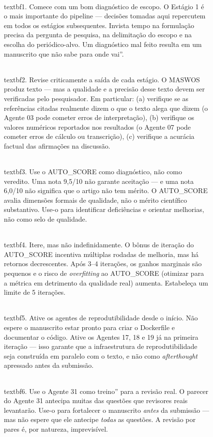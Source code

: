 \begin{figure}
\\textbf{1. Comece com um bom diagnóstico de escopo.} O
Estágio 1 é o mais importante do pipeline — decisões tomadas
aqui repercutem em todos os estágios subsequentes. Invista
tempo na formulação precisa da pergunta de pesquisa, na
delimitação do escopo e na escolha do periódico-alvo. Um
diagnóstico mal feito resulta em um manuscrito que não sabe
para onde vai''.

\\textbf{2. Revise criticamente a saída de cada estágio.}
O MASWOS produz texto — mas a qualidade e a precisão desse
texto devem ser verificadas pelo pesquisador. Em particular:
(a) verifique se as referências citadas realmente dizem o
que o texto alega que dizem (o Agente 03 pode cometer erros
de interpretação), (b) verifique os valores numéricos
reportados nos resultados (o Agente 07 pode cometer erros de
cálculo ou transcrição), (c) verifique a acurácia factual
das afirmações na discussão.

\\textbf{3. Use o AUTO\_SCORE como diagnóstico, não como
veredito.} Uma nota 9,5/10 não garante aceitação — e uma nota
6,0/10 não significa que o artigo não tem mérito. O
AUTO\_SCORE avalia dimensões formais de qualidade, não o
mérito científico substantivo. Use-o para identificar
deficiências e orientar melhorias, não como selo de qualidade.

\\textbf{4. Itere, mas não indefinidamente.} O bônus de
iteração do AUTO\_SCORE incentiva múltiplas rodadas de
melhoria, mas há retornos decrescentes. Após 3--4 iterações,
os ganhos marginais são pequenos e o risco de
\textit{overfitting} ao AUTO\_SCORE (otimizar para a
métrica em detrimento da qualidade real) aumenta. Estabeleça
um limite de 5 iterações.

\\textbf{5. Ative os agentes de reprodutibilidade desde o
início.} Não espere o manuscrito estar pronto para criar o
Dockerfile e documentar o código. Ative os Agentes 17, 18 e
19 já na primeira iteração — isso garante que a infraestrutura
de reprodutibilidade seja construída em paralelo com o texto,
e não como \textit{afterthought} apressado antes da
submissão.

\\textbf{6. Use o Agente 31 como treino'' para a revisão
real.} O parecer do Agente 31 antecipa muitas das questões que
revisores reais levantarão. Use-o para fortalecer o manuscrito
\textit{antes} da submissão — mas não espere que ele
antecipe \textit{todas} as questões. A revisão por pares é,
por natureza, imprevisível.


\end{figure}
